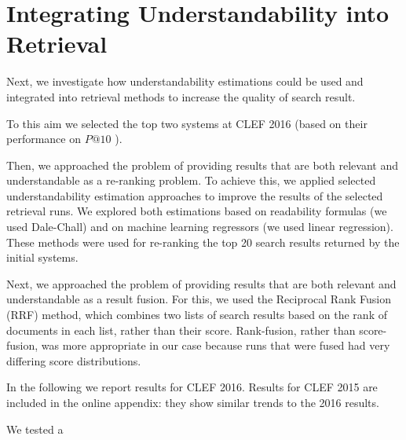 \section{Integrating Understandability into Retrieval}
\label{sec:experiments}

Next, we investigate how understandability estimations could be used and integrated into retrieval methods to increase the quality of search result. 

To this aim we selected the top two systems at CLEF 2016 (based on their performance on $P@10$ ). 

Then, we approached the problem of providing results that are both relevant and understandable as a re-ranking problem. To achieve this, we applied selected understandability estimation approaches to improve the results of the selected retrieval runs. We explored both estimations based on readability formulas (we used Dale-Chall) and on machine learning regressors (we used linear regression). These methods were used for re-ranking the top 20 search results returned by the initial systems. 

Next, we approached the problem of providing results that are both relevant and understandable as a result fusion. For this, we used the Reciprocal Rank Fusion (RRF) method, which combines two lists of search results based on the rank of documents in each list, rather than their score. Rank-fusion, rather than score-fusion, was more appropriate in our case because runs that were fused had very differing score distributions.

In the following we report results for CLEF 2016. Results for CLEF 2015 are included in the online appendix: they show similar trends to the 2016 results.

We tested a

